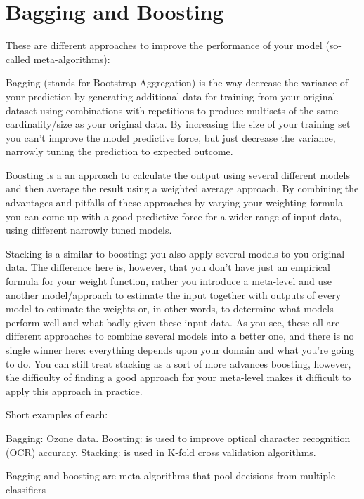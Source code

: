 \documentclass[caret-main.tex]{subfiles}
\begin{document}
\section{Bagging and Boosting}
These are different approaches to improve the performance of your model (so-called meta-algorithms):

Bagging (stands for Bootstrap Aggregation) is the way decrease the variance of your prediction by generating additional data for training from your original dataset using combinations with repetitions to produce multisets of the same cardinality/size as your original data. By increasing the size of your training set you can't improve the model predictive force, but just decrease the variance, narrowly tuning the prediction to expected outcome.

Boosting is a an approach to calculate the output using several different models and then average the result using a weighted average approach. By combining the advantages and pitfalls of these approaches by varying your weighting formula you can come up with a good predictive force for a wider range of input data, using different narrowly tuned models.

Stacking is a similar to boosting: you also apply several models to you original data. The difference here is, however, that you don't have just an empirical formula for your weight function, rather you introduce a meta-level and use another model/approach to estimate the input together with outputs of every model to estimate the weights or, in other words, to determine what models perform well and what badly given these input data.
As you see, these all are different approaches to combine several models into a better one, and there is no single winner here: everything depends upon your domain and what you're going to do. You can still treat stacking as a sort of more advances boosting, however, the difficulty of finding a good approach for your meta-level makes it difficult to apply this approach in practice.

Short examples of each:

Bagging: Ozone data.
Boosting: is used to improve optical character recognition (OCR) accuracy.
Stacking: is used in K-fold cross validation algorithms.



Bagging and boosting are meta-algorithms that pool decisions
from multiple classiﬁers
\end{document}
